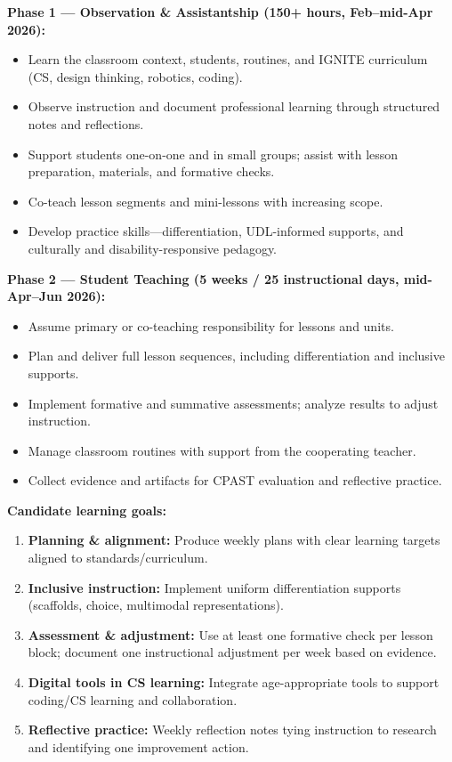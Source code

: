 \documentclass[10pt]{article}
\begin{document}
\textbf{Phase 1 --- Observation \& Assistantship (150+ hours, Feb--mid-Apr 2026):}
\begin{itemize}[leftmargin=*,itemsep=0.25em]
  \item Learn the classroom context, students, routines, and IGNITE curriculum (CS, design thinking, robotics, coding).
  \item Observe instruction and document professional learning through structured notes and reflections.
  \item Support students one-on-one and in small groups; assist with lesson preparation, materials, and formative checks.
  \item Co-teach lesson segments and mini-lessons with increasing scope.
  \item Develop practice skills—differentiation, UDL-informed supports, and culturally and disability-responsive pedagogy.
\end{itemize}

\textbf{Phase 2 --- Student Teaching (5 weeks / 25 instructional days, mid-Apr--Jun 2026):}
\begin{itemize}[leftmargin=*,itemsep=0.25em]
  \item Assume primary or co-teaching responsibility for lessons and units.
  \item Plan and deliver full lesson sequences, including differentiation and inclusive supports.
  \item Implement formative and summative assessments; analyze results to adjust instruction.
  \item Manage classroom routines with support from the cooperating teacher.
  \item Collect evidence and artifacts for CPAST evaluation and reflective practice.
\end{itemize}

\textbf{Candidate learning goals:}
\begin{enumerate}[leftmargin=*,itemsep=0.2em]
  \item \textbf{Planning \& alignment:} Produce weekly plans with clear learning targets aligned to standards/curriculum.
  \item \textbf{Inclusive instruction:} Implement uniform differentiation supports (scaffolds, choice, multimodal representations).
  \item \textbf{Assessment \& adjustment:} Use at least one formative check per lesson block; document one instructional adjustment per week based on evidence.
  \item \textbf{Digital tools in CS learning:} Integrate age-appropriate tools to support coding/CS learning and collaboration.
  \item \textbf{Reflective practice:} Weekly reflection notes tying instruction to research and identifying one improvement action.
\end{enumerate}
\end{document}
